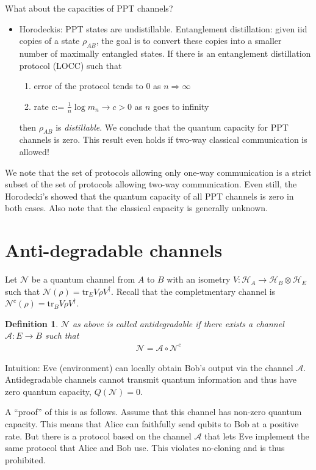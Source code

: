 \documentclass[10pt,oneside,longbibliography]{report}
\newtheorem{definition}{Definition}[section]
\begin{document}
What about the capacities of PPT channels?
\begin{itemize}
    \item Horodeckis: PPT states are undistillable. Entanglement distillation: given iid copies of a state $\rho_{AB}$, the goal is to convert these copies into a smaller number of maximally entangled states. If there is an entanglement distillation protocol (LOCC) such that 
    \begin{enumerate}
        \item error of the protocol tends to 0 as $n\Rightarrow \infty$
        \item rate c:= $\frac{1}{n} \log{m_n} \rightarrow c>0$ as $n$ goes to infinity
    \end{enumerate}
    then $\rho_{AB}$ is \textit{distillable}. We conclude that the quantum capacity for PPT channels is zero. This result even holds if two-way classical communication is allowed!
\end{itemize}

We note that the set of protocols allowing only one-way communication is a strict subset of the set of protocols allowing two-way communication. Even still, the Horodecki's showed that the quantum capacity of all PPT channels is zero in both cases. Also note that the classical capacity is generally unknown. 

\section{Anti-degradable channels}
Let $\mathcal{N}$ be a quantum channel from $A$ to $B$ with an isometry $V: \mathcal{H}_A \rightarrow \mathcal{H}_B \otimes \mathcal{H}_E$ such that $\mathcal{N}(\rho) = \text{tr}_E V \rho V^{\dagger}$. Recall that the completmentary channel is $\mathcal{N}^c (\rho) = \text{tr}_B V \rho V^{\dagger}$.

\begin{definition}
$\mathcal{N}$ as above is called antidegradable if there exists a channel $\mathcal{A}: E \rightarrow B$ such that 
\begin{align}
    \mathcal{N} = \mathcal{A}\circ \mathcal{N}^c
\end{align}
\end{definition}
Intuition: Eve (environment) can locally obtain Bob's output via the channel $\mathcal{A}$. Antidegradable channels cannot transmit quantum information and thus have zero quantum capacity, $Q(\mathcal{N})=0.$

A ``proof'' of this is as follows. Assume that this channel has non-zero quantum capacity. This means that Alice can faithfully send qubits to Bob at a positive rate. But there is a protocol based on the channel $\mathcal{A}$ that lets Eve implement the same protocol that Alice and Bob use. This violates no-cloning and is thus prohibited. 
\end{document}
